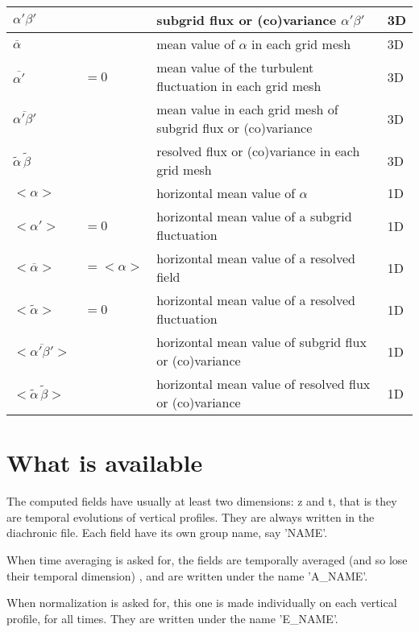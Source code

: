 \begin{center}
\begin{tabular}{|l|l|l|l|}
\hline
$\alpha'\beta'$ & & subgrid flux or (co)variance  $\alpha'\beta'$ & 3D \\
\hline
$\overline{\alpha}$  & & mean value of $\alpha$ in each grid mesh & 3D \\
\hline
$\overline{\alpha'}$  & $= 0$ & mean value of the turbulent fluctuation in each grid mesh & 3D \\
\hline
$\overline{\alpha'\beta'}$ & & mean value in each grid mesh of subgrid flux or (co)variance & 3D\\
\hline
$\tilde{\alpha}\,\tilde{\beta}$ & & resolved flux or (co)variance in each grid mesh & 3D\\
\hline
$<\alpha>$ & &  horizontal mean value of $\alpha$ & 1D \\
\hline
$<\alpha'>$ & $=0$ &  horizontal mean value of a subgrid fluctuation & 1D\\
\hline
$<\overline{\alpha}>$ & $= <\alpha>$ &  horizontal mean value of a resolved field& 1D\\
\hline
$<\tilde{\alpha}>$ & $= 0$ &  horizontal mean value of a resolved fluctuation& 1D\\
\hline
$<\overline{\alpha'\beta'}>$ & & horizontal mean value of subgrid flux or (co)variance & 1D\\
\hline
$<\tilde{\alpha}\,\tilde{\beta}>$ & & horizontal mean value of resolved flux or (co)variance & 1D\\
\hline
\end{tabular}
\end{center}


\section{What is available}

The computed fields have usually at least two
dimensions: z and t, that is they are temporal evolutions
of vertical profiles. They are always written in the 
diachronic file. Each field have its own group name,
say 'NAME'.

When time averaging is asked for, the fields are temporally
averaged (and so lose their temporal dimension) , and are written
under the name 'A\_NAME'.

When normalization is asked for, this one is made individually on
each vertical profile, for all times. They are written under
the name 'E\_NAME'.

